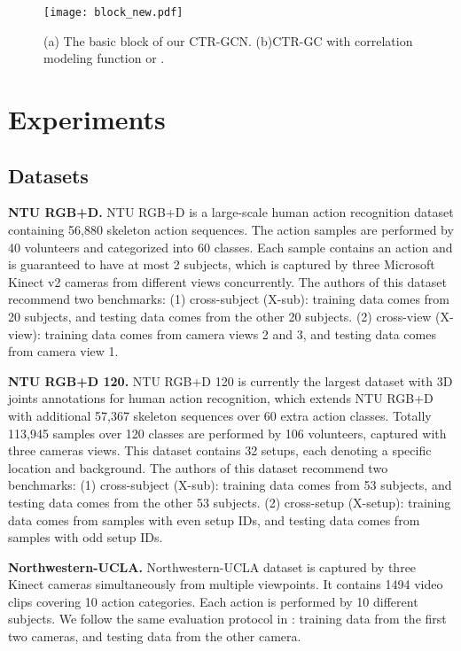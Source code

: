 \documentclass[10pt,twocolumn,letterpaper]{article}
\begin{document}
\begin{figure}[t]
	\centering
	\texttt{[image: block\_new.pdf]} \caption{(a) The basic block of our CTR-GCN. (b)CTR-GC with correlation modeling function  or .}
	\label{fig:gc_instance}
	\vspace{-0.5cm}
\end{figure}


\section{Experiments}

\subsection{Datasets}
\noindent \textbf{NTU RGB+D.} NTU RGB+D \cite{shahroudy2016ntu} is a large-scale human action recognition dataset containing 56,880 skeleton action sequences. The action samples are performed by 40 volunteers and categorized into 60 classes. Each sample contains an action and is guaranteed to have at most 2 subjects, which is captured by three Microsoft Kinect v2 cameras from different views concurrently. The authors of this dataset recommend two benchmarks: (1) cross-subject (X-sub): training data comes from 20 subjects, and testing data comes from the other 20 subjects. (2) cross-view (X-view): training data comes from camera views 2 and 3, and testing data comes from camera view 1.

\noindent \textbf{NTU RGB+D 120.} NTU RGB+D 120 \cite{liu2019ntu} is currently the largest dataset with 3D joints annotations for human action recognition, which extends NTU RGB+D with additional 57,367 skeleton sequences over 60 extra action classes. Totally 113,945 samples over 120 classes are performed by 106 volunteers, captured with three cameras views. This dataset contains 32 setups, each denoting a specific location and background. The authors of this dataset recommend two benchmarks: (1) cross-subject (X-sub): training data comes from 53 subjects, and testing data comes from the other 53 subjects. (2) cross-setup (X-setup): training data comes from samples with even setup IDs, and testing data comes from samples with odd setup IDs.

\noindent \textbf{Northwestern-UCLA.} Northwestern-UCLA dataset \cite{wang2014cross} is captured by three Kinect cameras simultaneously from multiple viewpoints. It contains 1494 video clips covering 10 action categories. Each action is performed by 10 different subjects. We follow the same evaluation protocol in \cite{wang2014cross}: training data from the first two cameras, and testing data from the other camera.
\end{document}
